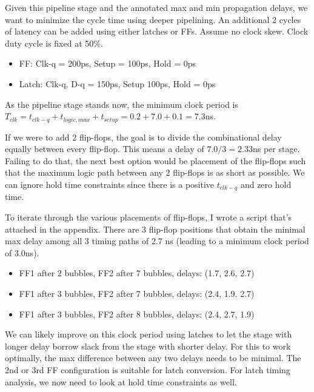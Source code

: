 \documentclass[11pt]{article}
\begin{document}
Given this pipeline stage and the annotated max and min propagation delays, we want to minimize the cycle time using deeper pipelining. An additional 2 cycles of latency can be added using either latches or FFs. Assume no clock skew. Clock duty cycle is fixed at 50\%.

\begin{itemize}
	\item FF: Clk-q = 200ps, Setup = 100ps, Hold = 0ps
	\item Latch: Clk-q, D-q = 150ps, Setup 100ps, Hold = 0ps
\end{itemize}

As the pipeline stage stands now, the minimum clock period is $T_{clk} = t_{clk-q} + t_{logic,max} + t_{setup} = 0.2 + 7.0 + 0.1 = 7.3$ns.

If we were to add 2 flip-flops, the goal is to divide the combinational delay equally between every flip-flop. This means a delay of $7.0/3 = 2.33$ns per stage. Failing to do that, the next best option would be placement of the flip-flops such that the maximum logic path between any 2 flip-flops is as short as possible. We can ignore hold time constraints since there is a positive $t_{clk-q}$ and zero hold time.

To iterate through the various placements of flip-flops, I wrote a script that's attached in the appendix. There are 3 flip-flop positions that obtain the minimal max delay among all 3 timing paths of 2.7 ns (leading to a minimum clock period of 3.0ns).

\begin{itemize}
	\item FF1 after 2 bubbles, FF2 after 7 bubbles, delays: (1.7, 2.6, 2.7)
	\item FF1 after 3 bubbles, FF2 after 7 bubbles, delays: (2.4, 1.9. 2.7)
	\item FF1 after 3 bubbles, FF2 after 8 bubbles, delays: (2.4, 2.7, 1.9)
\end{itemize}

We can likely improve on this clock period using latches to let the stage with longer delay borrow slack from the stage with shorter delay. For this to work optimally, the max difference between any two delays needs to be minimal. The 2nd or 3rd FF configuration is suitable for latch conversion. For latch timing analysis, we now need to look at hold time constraints as well.



\newpage
\appendix
\end{document}
